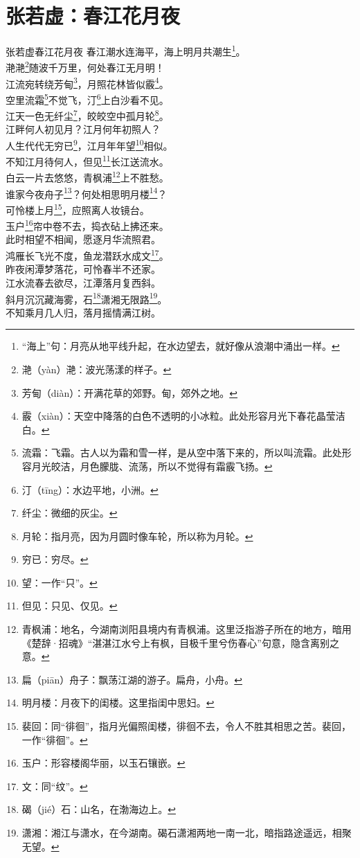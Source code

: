 \documentclass[12pt,oneside,a5paper]{book}
\begin{document}
\chapter{张若虚：春江花月夜}
\begin{poemzh}{张若虚}{春江花月夜}
春江潮水连海平，海上明月共潮生\footnote[1]{“海上”句：月亮从地平线升起，在水边望去，就好像从浪潮中涌出一样。}。\\
滟滟\footnote{滟（yàn）滟：波光荡漾的样子。}随波千万里，何处春江无月明！\\
江流宛转绕芳甸\footnote{芳甸（diàn）：开满花草的郊野。甸，郊外之地。}，月照花林皆似霰\footnote{霰（xiàn）：天空中降落的白色不透明的小冰粒。此处形容月光下春花晶莹洁白。}。\\
空里流霜\footnote{流霜：飞霜。古人以为霜和雪一样，是从空中落下来的，所以叫流霜。此处形容月光皎洁，月色朦胧、流荡，所以不觉得有霜霰飞扬。}不觉飞，汀\footnote{汀（tīng）：水边平地，小洲。}上白沙看不见。\\
江天一色无纤尘\footnote{纤尘：微细的灰尘。}，皎皎空中孤月轮\footnote{月轮：指月亮，因为月圆时像车轮，所以称为月轮。}。\\
江畔何人初见月？江月何年初照人？\\
人生代代无穷已\footnote{穷已：穷尽。}，江月年年望\footnote{望：一作“只”。}相似。\\
不知江月待何人，但见\footnote{但见：只见、仅见。}长江送流水。\\
白云一片去悠悠，青枫浦\footnote{青枫浦：地名，今湖南浏阳县境内有青枫浦。这里泛指游子所在的地方，暗用《楚辞·招魂》“湛湛江水兮上有枫，目极千里兮伤春心”句意，隐含离别之意。}上不胜愁。\\
谁家今夜舟子\footnote{扁（piān）舟子：飘荡江湖的游子。扁舟，小舟。}？何处相思明月楼\footnote{明月楼：月夜下的闺楼。这里指闺中思妇。}？\\
可怜楼上月\footnote{裴回：同“徘徊”，指月光偏照闺楼，徘徊不去，令人不胜其相思之苦。裴回，一作“徘徊”。}，应照离人妆镜台。\\
玉户\footnote{玉户：形容楼阁华丽，以玉石镶嵌。}帘中卷不去，捣衣砧上拂还来。\\
此时相望不相闻，愿逐月华流照君。\\
鸿雁长飞光不度，鱼龙潜跃水成文\footnote{文：同“纹”。}。\\
昨夜闲潭梦落花，可怜春半不还家。\\
江水流春去欲尽，江潭落月复西斜。\\
斜月沉沉藏海雾，石\footnote{碣（jié）石：山名，在渤海边上。}潇湘无限路\footnote{潇湘：湘江与潇水，在今湖南。碣石潇湘两地一南一北，暗指路途遥远，相聚无望。}。\\
不知乘月几人归，落月摇情满江树。\\
\end{poemzh}
\end{document}
